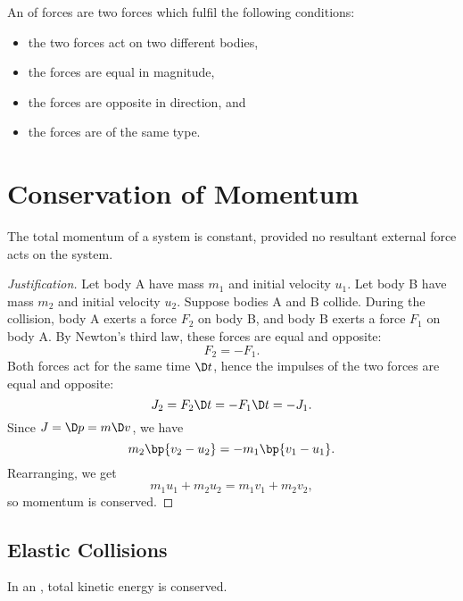 \begin{definition}
    An  of forces are two forces which fulfil the following conditions:
    \begin{itemize}
        \item the two forces act on two different bodies,
        \item the forces are equal in magnitude,
        \item the forces are opposite in direction, and
        \item the forces are of the same type.
    \end{itemize} 
\end{definition}

\section{Conservation of Momentum}

\begin{law}
    The total momentum of a system is constant, provided no resultant external force acts on the system.
\end{law}
\begin{proof}[Justification]
    Let body A have mass $m_1$ and initial velocity $u_1$. Let body B have mass $m_2$ and initial velocity $u_2$. Suppose bodies A and B collide. During the collision, body A exerts a force $F_2$ on body B, and body B exerts a force $F_1$ on body A. By Newton's third law, these forces are equal and opposite: \[F_2 = -F_1.\] Both forces act for the same time $\D t$, hence the impulses of the two forces are equal and opposite: \[J_2 = F_2 \D t = -F_1 \D t = -J_1.\] Since $J = \D p = m \D v$, we have \[m_2 \bp{v_2 - u_2} = -m_1 \bp{v_1 - u_1}.\] Rearranging, we get \[m_1 u_1 + m_2 u_2 = m_1 v_1 + m_2 v_2,\] so momentum is conserved.
\end{proof}

\subsection{Elastic Collisions}

\begin{definition}
    In an , total kinetic energy is conserved.
\end{definition}

